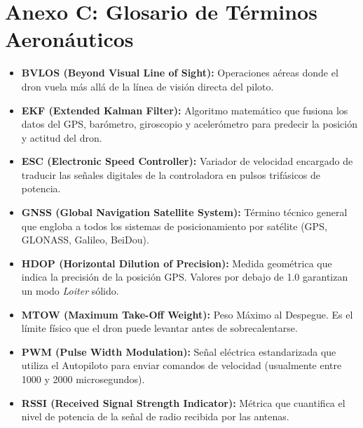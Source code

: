 \documentclass[12pt,a4paper]{article}
\begin{document}
\section{Anexo C: Glosario de Términos Aeronáuticos}
\begin{itemize}[leftmargin=*]
    \item \textbf{BVLOS (Beyond Visual Line of Sight):} Operaciones aéreas donde el dron vuela más allá de la línea de visión directa del piloto.
    \item \textbf{EKF (Extended Kalman Filter):} Algoritmo matemático que fusiona los datos del GPS, barómetro, giroscopio y acelerómetro para predecir la posición y actitud del dron.
    \item \textbf{ESC (Electronic Speed Controller):} Variador de velocidad encargado de traducir las señales digitales de la controladora en pulsos trifásicos de potencia.
    \item \textbf{GNSS (Global Navigation Satellite System):} Término técnico general que engloba a todos los sistemas de posicionamiento por satélite (GPS, GLONASS, Galileo, BeiDou).
    \item \textbf{HDOP (Horizontal Dilution of Precision):} Medida geométrica que indica la precisión de la posición GPS. Valores por debajo de 1.0 garantizan un modo \textit{Loiter} sólido.
    \item \textbf{MTOW (Maximum Take-Off Weight):} Peso Máximo al Despegue. Es el límite físico que el dron puede levantar antes de sobrecalentarse.
    \item \textbf{PWM (Pulse Width Modulation):} Señal eléctrica estandarizada que utiliza el Autopiloto para enviar comandos de velocidad (usualmente entre 1000 y 2000 microsegundos).
    \item \textbf{RSSI (Received Signal Strength Indicator):} Métrica que cuantifica el nivel de potencia de la señal de radio recibida por las antenas.
\end{itemize}
\end{document}
